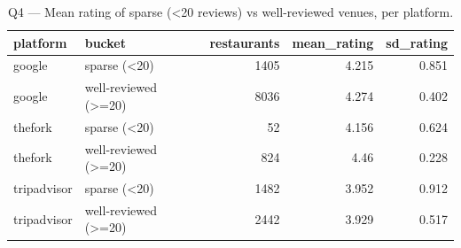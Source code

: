 \begin{table}[ht]
\centering
\caption{Q4 — Mean rating of sparse (<20 reviews) vs well-reviewed venues, per platform.}
\label{tab:q4_sparse_inflation}
{\tiny
\begin{tabular}{llrrr}
\toprule
platform & bucket & restaurants & mean\_rating & sd\_rating \\
\midrule
google & sparse (<20) & 1405 & 4.215 & 0.851 \\
google & well-reviewed (>=20) & 8036 & 4.274 & 0.402 \\
thefork & sparse (<20) & 52 & 4.156 & 0.624 \\
thefork & well-reviewed (>=20) & 824 & 4.46 & 0.228 \\
tripadvisor & sparse (<20) & 1482 & 3.952 & 0.912 \\
tripadvisor & well-reviewed (>=20) & 2442 & 3.929 & 0.517 \\
\bottomrule
\end{tabular}
}
\end{table}

